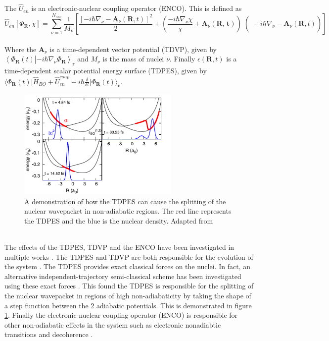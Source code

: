 \\\\
The $\hat{U}_{en}$ is an electronic-nuclear coupling operator (ENCO). This is defined as \begin{equation}
  \hat{U}_{en}[\Phi_{\textbf{R}}, \chi] = \sum_{\nu=1}^{N_{nuc}} \frac{1}{M_{\nu}} \left[ \frac{\left[-i \hbar \nabla_{\nu} - \textbf{A}_{\nu}(\textbf{R}, t) \right]^2}{2} + \left( \left. \left. \frac{-i\hbar \nabla_{\nu} \chi}{\chi} + \textbf{A}_{\nu}(\textbf{R, t})\right)\right( -i\hbar\nabla_{\nu} - \textbf{A}_{\nu}(\textbf{R}, t)\right) \right]
  \label{eq:ENCO}
\end{equation}
\\
Where the $\textbf{A}_{\nu}$ is a time-dependent vector potential (TDVP), given by $\left\langle \Phi_{\textbf{R}}(t) \right\vert \left. - i \hbar \nabla_{\nu} \Phi_{\textbf{R}} \right\rangle_{\textbf{r}}$ and $M_{\nu}$ is the mass of nuclei $\nu$.
Finally $\epsilon(\textbf{R}, t)$ is a time-dependent scalar potential energy surface (TDPES), given by $\langle \Phi_{\textbf{R}}(t) \vert \hat{H}_{BO} + \hat{U}_{en}^{coup} - i\hbar \frac{\delta}{\delta t} \vert \Phi_{\textbf{R}}(t) \rangle_{\textbf{r}}$.
\begin{figure}
  \includegraphics[width=0.7\textwidth]{./img/nuclear_splitting_TDPES.png}
  \caption{A demonstration of how the TDPES can cause the splitting of the nuclear wavepacket in non-adiabatic regions. The red line represents the TDPES and the blue is the nuclear density. Adapted from \cite{agostini_exact_2015} \label{fig:step_TDPES}}
\end{figure}
\\
The effects of the TDPES, TDVP and the ENCO have been investigated in multiple works \cite{agostini_semiclassical_2015, agostini_exact_2015, agostini_mixed_2013, abedi_dynamical_2013, Min2014Dec}. The TDPES and TDVP are both responsible for the evolution of the system
\cite{agostini_semiclassical_2015}.  The TDPES provides exact classical forces on the nuclei. In fact, an alternative independent-trajectory semi-classical scheme has been investigated using these exact forces \cite{agostini_exact_2015}. This found the TDPES is responsible for the splitting of the nuclear wavepacket in regions of high non-adiabaticity by taking the shape of a step function between the 2 adiabatic potentials. This is demonstrated in figure \ref{fig:step_TDPES}. Finally the electronic-nuclear coupling operator (ENCO) is responsible for other non-adiabatic effects in the system such as electronic nonadiabtic transitions and decoherence \cite{agostini_semiclassical_2015}.
